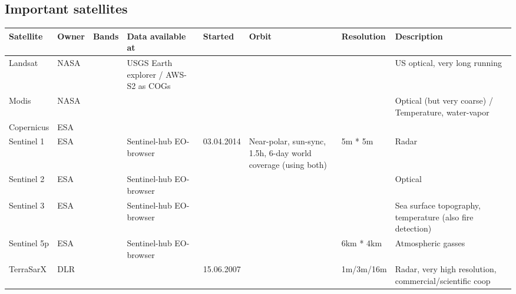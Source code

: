 \subsection{Important satellites}


\begin{table}
    \centering
    \begin{tabular}{llllllll}
        \toprule
        Satellite   & Owner & Bands & Data available at                    & Started    & Orbit                                                         & Resolution & Description                                               \\
        \midrule
        Landsat     & NASA  &       & USGS Earth explorer / AWS-S2 as COGs &            &                                                               &            & US optical, very long running                             \\
        Modis       & NASA  &       &                                      &            &                                                               &            & Optical (but very coarse) / Temperature, water-vapor      \\
        Copernicus  & ESA   &       &                                      &            &                                                               &            &                                                           \\
        Sentinel 1  & ESA   &       & Sentinel-hub EO-browser              & 03.04.2014 & Near-polar, sun-sync, 1.5h, 6-day world coverage (using both) & 5m * 5m    & Radar                                                     \\
        Sentinel 2  & ESA   &       & Sentinel-hub EO-browser              &            &                                                               &            & Optical                                                   \\
        Sentinel 3  & ESA   &       & Sentinel-hub EO-browser              &            &                                                               &            & Sea surface topography, temperature (also fire detection) \\
        Sentinel 5p & ESA   &       & Sentinel-hub EO-browser              &            &                                                               & 6km * 4km  & Atmospheric gasses                                        \\
        TerraSarX   & DLR   &       &                                      & 15.06.2007 &                                                               & 1m/3m/16m  & Radar, very high resolution, commercial/scientific coop   \\

\end{tabular}
\end{table}
